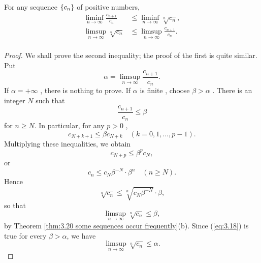 \begin{thm}
    \label{thm:3.37}
    For any sequence $\protect\{c_n\}$ of positive numbers,
    \begin{align*}
        \liminf_{n \to \infty} \frac{c_{n+1}}{c_n} &\leq 
        \liminf_{n \to \infty} \sqrt[n]{c_n}, \\
        \limsup_{n \to \infty} \sqrt[n]{c_n} &\leq
        \limsup_{n \to \infty} \frac{c_{n+1}}{c_n}. \\
    \end{align*} 
\end{thm}

\begin{proof}
    We shall prove the second inequality;
    the proof of the first is quite similar.
    Put
    \begin{equation*}
        \alpha = \limsup_{n \to \infty} \frac{c_{n+1}}{c_n}.
    \end{equation*}
    If $\alpha = +\infty$ , there is nothing to prove.
    If $\alpha$ is finite , choose $\beta > \alpha$ .
    There is an integer $N$ such that
    \begin{equation*}
        \frac{c_{n+1}}{c_n} \leq \beta
    \end{equation*}
    for $n \geq N$. In particular, for any $p > 0$ ,
    \begin{equation*}
        c_{N+k+1} \leq \beta c_{N+k} \quad
        (k=0,1,\dots,p-1).
    \end{equation*} 
    Multiplying these inequalities, we obtain
    \begin{equation*}
        c_{N+p} \leq \beta^p c_N,
    \end{equation*}
    or
    \begin{equation*}
        c_n \leq c_N \beta^{-N}\cdot \beta^n \quad (n \geq N).
    \end{equation*}
    Hence
    \begin{equation*}
        \sqrt[n]{c_n} \leq
        \sqrt[n]{c_N \beta^{-N}}\cdot \beta,
    \end{equation*}
    so that
    \begin{equation}
        \label{eq:3.18}
        \limsup_{n \to \infty} \sqrt[n]{c_n} \leq \beta,
    \end{equation}
    by Theorem \ref{thm:3.20 some sequences occur frequently}(b).
    Since (\ref{eq:3.18}) is true for every $\beta > \alpha$, we have
    \begin{equation*}
        \limsup_{n \to \infty} 
        \sqrt[n]{c_n} \leq \alpha.
    \end{equation*}
\end{proof}